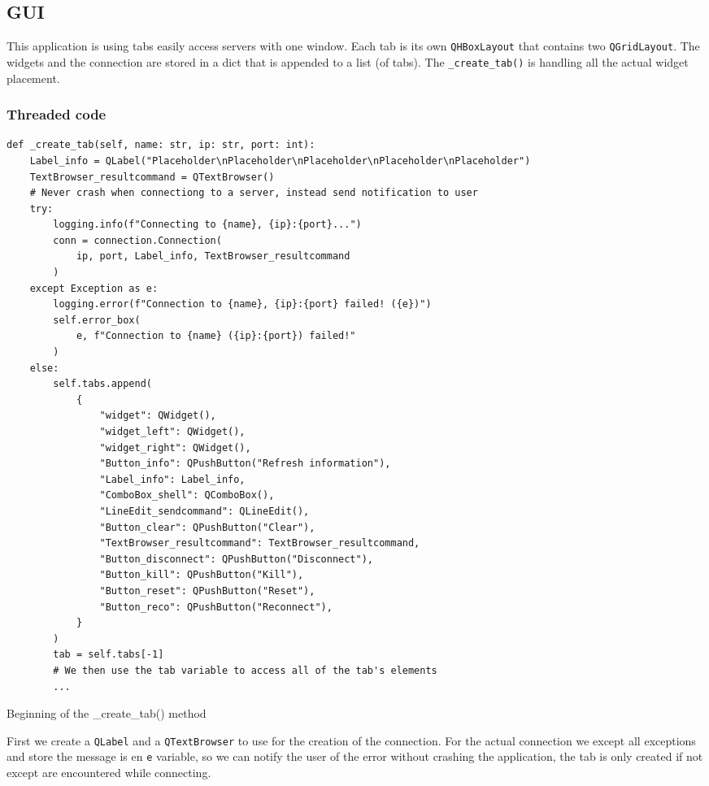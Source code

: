 \documentclass{article}
\begin{document}
\subsection{GUI}
This application is using tabs easily access servers with one window. Each tab
is its own \verb|QHBoxLayout| that contains two \verb|QGridLayout|. The widgets
and the connection are stored in a dict that is appended to a list (of tabs).
The \verb|_create_tab()| is handling all the actual widget placement.

\subsubsection{Threaded code}
\begin{listing}[H]
    \begin{verbatim}
def _create_tab(self, name: str, ip: str, port: int):
    Label_info = QLabel("Placeholder\nPlaceholder\nPlaceholder\nPlaceholder\nPlaceholder")
    TextBrowser_resultcommand = QTextBrowser()
    # Never crash when connectiong to a server, instead send notification to user
    try:
        logging.info(f"Connecting to {name}, {ip}:{port}...")
        conn = connection.Connection(
            ip, port, Label_info, TextBrowser_resultcommand
        )
    except Exception as e:
        logging.error(f"Connection to {name}, {ip}:{port} failed! ({e})")
        self.error_box(
            e, f"Connection to {name} ({ip}:{port}) failed!"
        )
    else:
        self.tabs.append(
            {
                "widget": QWidget(),
                "widget_left": QWidget(),
                "widget_right": QWidget(),
                "Button_info": QPushButton("Refresh information"),
                "Label_info": Label_info,
                "ComboBox_shell": QComboBox(),
                "LineEdit_sendcommand": QLineEdit(),
                "Button_clear": QPushButton("Clear"),
                "TextBrowser_resultcommand": TextBrowser_resultcommand,
                "Button_disconnect": QPushButton("Disconnect"),
                "Button_kill": QPushButton("Kill"),
                "Button_reset": QPushButton("Reset"),
                "Button_reco": QPushButton("Reconnect"),
            }
        )
        tab = self.tabs[-1]
        # We then use the tab variable to access all of the tab's elements
        ...
    \end{verbatim}
    \caption{Beginning of the \_create\_tab() method}
    \label{client:createtab}
\end{listing}

First we create a \verb|QLabel| and a \verb|QTextBrowser| to use for the
creation of the connection. For the actual connection we except all exceptions
and store the message is en \verb|e| variable, so we can notify the user of the
error without crashing the application, the tab is only created if not except
are encountered while connecting.
\end{document}
